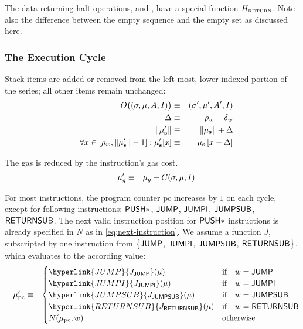 The data-returning halt operations, \hyperlink{RETURN}{ } and  , have a special function $H_{\text{\tiny RETURN}}$. Note also the difference between the empty sequence and the empty set as discussed \hyperlink{empty_sequence_vs_empty_set}{here}.

\subsubsection{The Execution Cycle}

Stack items are added or removed from the left-most, lower-indexed portion of the series; all other items remain unchanged:
\begin{eqnarray}
O\big((\mathbf{\sigma}, \mathbf{\mu}, A, I)\big) & \equiv & (\mathbf{\sigma}', \mathbf{\mu}', A', I) \\
\Delta & \equiv & \mathbf{\rho}_{w} - \mathbf{\delta}_{w} \\
\lVert\mathbf{\mu}'_{\mathbf{s}}\rVert & \equiv & \lVert\mathbf{\mu}_{\mathbf{s}}\rVert + \Delta \\
\quad \forall x \in \left[ \mathbf{\rho}_{w}, \lVert\mathbf{\mu}'_{\mathbf{s}}\rVert -1 \right]: \mathbf{\mu}'_{\mathbf{s}}[x] & \equiv & \mathbf{\mu}_{\mathbf{s}}\left[x-\Delta \right]
\end{eqnarray}

The gas is reduced by the instruction's gas cost.
\begin{eqnarray}
	\quad \mathbf{\mu}'_{g} & \equiv & \mathbf{\mu}_{g} - C(\mathbf{\sigma}, \mathbf{\mu}, I) \label{eq:mu_pc}
\end{eqnarray}

For most instructions, the program counter $\mathrm{pc}$ increases by $1$ on each cycle, except for following instructions: $\mathsf{PUSH*}$, $\mathsf{JUMP}$, $\mathsf{JUMPI}$, $\mathsf{JUMPSUB}$, $\mathsf{RETURNSUB}$.
The next valid instruction position for $\mathsf{PUSH*}$ instructions is already specified in $N$ as in \cref{eq:next-instruction}. 
We assume a function $J$, subscripted by one instruction from $\big\{\mathsf{JUMP}$, $\mathsf{JUMPI}$, $\mathsf{JUMPSUB}$, $\mathsf{RETURNSUB}\big\}$, which evaluates to the according value:
\begin{eqnarray}\label{eq:u_pc}
	\quad \mst'_{\mathrm{pc}} & \eqdef & 
	\begin{cases}
		\hyperlink{JUMP}{J_{\op{JUMP}}}(\mst) & \text{if} \quad w =  \op{JUMP} \\
		\hyperlink{JUMPI}{J_{\op{JUMPI}}}(\mst) & \text{if} \quad w =  \op{JUMPI} \\
		\hyperlink{JUMPSUB}{J_{\op{JUMPSUB}}}(\mst) & \text{if} \quad w =  \op{JUMPSUB} \\
		\hyperlink{RETURNSUB}{J_{\op{RETURNSUB}}}(\mst) & \text{if} \quad w =  \op{RETURNSUB} \\
		N(\mst_{\mathrm{pc}}, w) & \text{otherwise}
	\end{cases}
\end{eqnarray}


